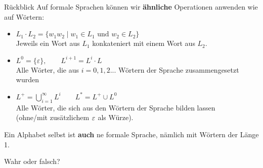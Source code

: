 



\morescalingdelimiters




 \framePrevEpisode


 
\begin{frame}{Rückblick}
	Auf formale Sprachen können wir \textbf{ähnliche} Operationen anwenden wie auf Wörtern:
	\begin{itemize}
		\item $L_1 \cdot L_2 = \{w_1 w_2 \mid w_1 \in L_1 \text{ und } w_2 \in L_2 \}$\\
		Jeweils ein Wort aus $L_1$ konkateniert mit einem Wort aus $L_2$.
		\pause
		\item $L^0 = \{\varepsilon \}, \qquad L^{i+1} = L^i \cdot L$\\
		Alle Wörter, die aus $i = 0,1,2...$ Wörtern der Sprache zusammengesetzt wurden
		\pause
		\item $L^+ = \bigcup \limits_{i=1}^\infty L^i \qquad L^* = L^+ \cup L^0$\\
		Alle Wörter, die sich aus den Wörtern der Sprache bilden lassen \\ 
		(ohne/mit zusätzlichem $\varepsilon$ als Würze).
	\end{itemize}
	Ein Alphabet selbst ist \textbf{auch} ne formale Sprache, nämlich mit Wörtern der Länge 1.
\end{frame}

\begin{frame}[t]{Wahr oder falsch?}
\end{frame}



